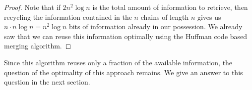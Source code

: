 \begin{proof}
Note that if \(2n^2 \log n\) is the total amount of information to retrieve,
then recycling the information contained in the \(n\) chains of length \(n\)
gives us \(n \cdot n \log n = n^2 \log n\) bits of information already in our
possession. We already saw that we can reuse this information optimally using
the Huffman code based merging algorithm.
\end{proof}

Since this algorithm reuses only a fraction of the available information, the
question of the optimality of this approach remains. We give an answer to this
question in the next section.
